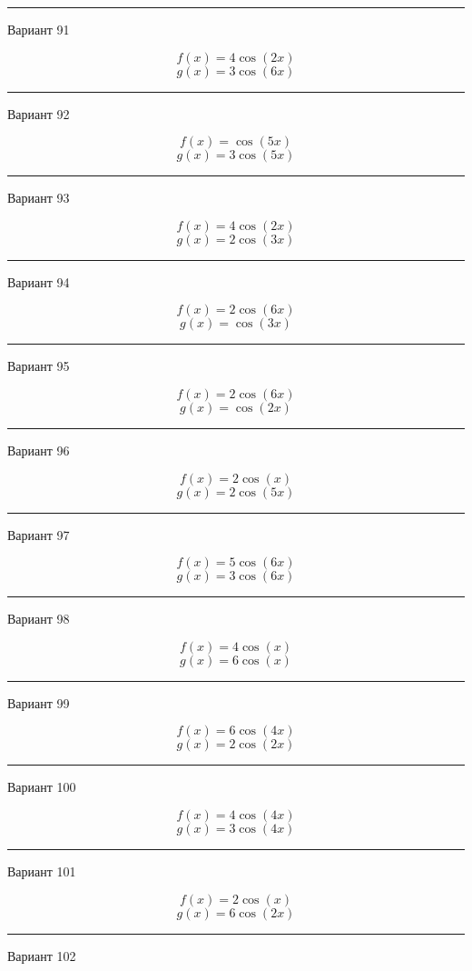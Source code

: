 \documentclass[11pt]{report}
\begin{document}
\rule{\textwidth}{.2mm}

Вариант 91

$$f(x)=4 \cos{\left(2 x \right)}$$
$$g(x)=3 \cos{\left(6 x \right)}$$

\rule{\textwidth}{.2mm}

Вариант 92

$$f(x)=\cos{\left(5 x \right)}$$
$$g(x)=3 \cos{\left(5 x \right)}$$

\rule{\textwidth}{.2mm}

Вариант 93

$$f(x)=4 \cos{\left(2 x \right)}$$
$$g(x)=2 \cos{\left(3 x \right)}$$

\rule{\textwidth}{.2mm}

Вариант 94

$$f(x)=2 \cos{\left(6 x \right)}$$
$$g(x)=\cos{\left(3 x \right)}$$

\rule{\textwidth}{.2mm}

Вариант 95

$$f(x)=2 \cos{\left(6 x \right)}$$
$$g(x)=\cos{\left(2 x \right)}$$

\rule{\textwidth}{.2mm}

Вариант 96

$$f(x)=2 \cos{\left(x \right)}$$
$$g(x)=2 \cos{\left(5 x \right)}$$

\rule{\textwidth}{.2mm}

Вариант 97

$$f(x)=5 \cos{\left(6 x \right)}$$
$$g(x)=3 \cos{\left(6 x \right)}$$

\rule{\textwidth}{.2mm}

Вариант 98

$$f(x)=4 \cos{\left(x \right)}$$
$$g(x)=6 \cos{\left(x \right)}$$

\rule{\textwidth}{.2mm}

Вариант 99

$$f(x)=6 \cos{\left(4 x \right)}$$
$$g(x)=2 \cos{\left(2 x \right)}$$

\rule{\textwidth}{.2mm}

Вариант 100

$$f(x)=4 \cos{\left(4 x \right)}$$
$$g(x)=3 \cos{\left(4 x \right)}$$

\rule{\textwidth}{.2mm}

Вариант 101

$$f(x)=2 \cos{\left(x \right)}$$
$$g(x)=6 \cos{\left(2 x \right)}$$

\rule{\textwidth}{.2mm}

Вариант 102
\end{document}
